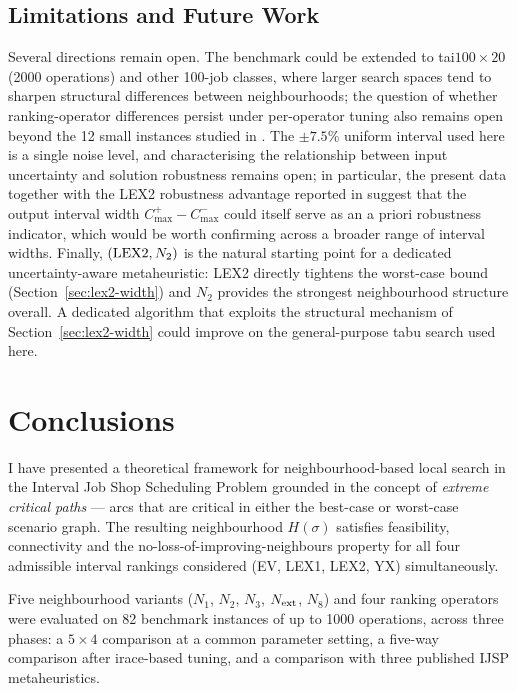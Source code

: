 \documentclass[preprint,12pt]{elsarticle}
\begin{document}
\subsection{Limitations and Future Work}
\label{sec:limitations}

Several directions remain open. The benchmark could be extended to tai$100{\times}20$ (2000 operations) and other 100-job classes, where larger search spaces tend to sharpen structural differences between neighbourhoods; the question of whether ranking-operator differences persist under per-operator tuning also remains open beyond the 12 small instances studied in \cite{DiazICAE2023,DiazIGPL2022}. The $\pm 7.5\%$ uniform interval used here is a single noise level, and characterising the relationship between input uncertainty and solution robustness remains open; in particular, the present data together with the LEX2 robustness advantage reported in \cite{DiazICAE2023,DiazIGPL2022} suggest that the output interval width $C^+_{\max} - C^-_{\max}$ could itself serve as an a priori robustness indicator, which would be worth confirming across a broader range of interval widths. Finally, $({\rm LEX2}, N_2)$ is the natural starting point for a dedicated uncertainty-aware metaheuristic: LEX2 directly tightens the worst-case bound (Section~\ref{sec:lex2-width}) and $N_2$ provides the strongest neighbourhood structure overall. A dedicated algorithm that exploits the structural mechanism of Section~\ref{sec:lex2-width} could improve on the general-purpose tabu search used here.


\section{Conclusions}
\label{sec:conclusions}

I have presented a theoretical framework for neighbourhood-based local search in the Interval Job Shop Scheduling Problem grounded in the concept of \emph{extreme critical paths} --- arcs that are critical in either the best-case or worst-case scenario graph. The resulting neighbourhood $H(\sigma)$ satisfies feasibility, connectivity and the no-loss-of-improving-neighbours property for all four admissible interval rankings considered (EV, LEX1, LEX2, YX) simultaneously.

Five neighbourhood variants ($N_1$, $N_2$, $N_3$, $N_{\rm ext}$, $N_8$) and four ranking operators were evaluated on 82 benchmark instances of up to 1000 operations, across three phases: a $5 \times 4$ comparison at a common parameter setting, a five-way comparison after irace-based tuning, and a comparison with three published IJSP metaheuristics.
\end{document}
